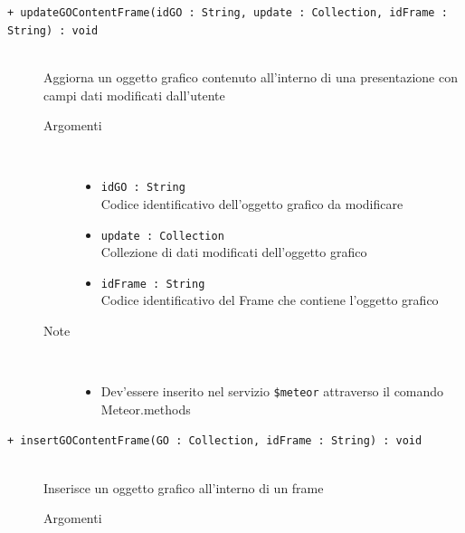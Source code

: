 \begin{description}
	\begin{description}
		\item[\texttt{+ updateGOContentFrame(idGO : String, update : Collection, idFrame : String) : void			}] \hfill \\
			Aggiorna un oggetto grafico contenuto all'interno di una presentazione con  campi dati modificati dall'utente
			
		\begin{description}
			\item[Argomenti] \hfill \\
				\begin{itemize}
				
					\item \texttt{idGO : String			} \hfill \\
					Codice identificativo dell'oggetto grafico da modificare
					\item \texttt{update : Collection			} \hfill \\
					Collezione di dati modificati dell'oggetto grafico
					\item \texttt{idFrame :  String		} \hfill \\
					Codice identificativo del Frame che contiene l'oggetto grafico
					
				\end{itemize}
			\item[Note] \hfill \\
			\begin{itemize}
					\item Dev'essere inserito nel servizio \texttt{\$meteor} attraverso il comando Meteor.methods
				\end{itemize}
		\end{description}
	\end{description}
	
	\begin{description}
		\item[\texttt{+ insertGOContentFrame(GO : Collection, idFrame : String) : void			}] \hfill \\
			Inserisce un oggetto grafico all'interno di un frame
			
		\begin{description}
			\item[Argomenti] \hfill \\
				\begin{itemize}
				

\end{itemize}
\end{description}
\end{description}
\end{description}

